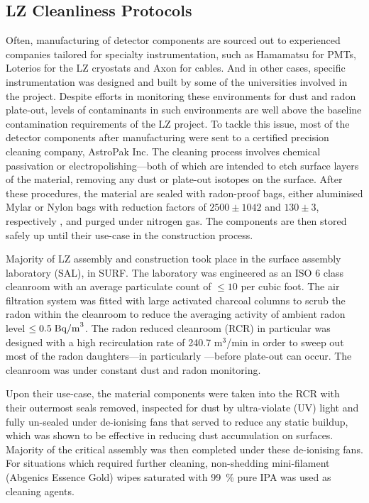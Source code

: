 \subsection{LZ Cleanliness Protocols}
\label{secsec:cleanliness}

Often, manufacturing of detector components are sourced out to  experienced companies tailored for specialty instrumentation, such as Hamamatsu for PMTs, Loterios for the LZ cryostats and Axon for cables. And in other cases, specific instrumentation was designed and built by some of the universities involved in the project. Despite efforts in monitoring these environments for dust and radon plate-out, levels of contaminants in such environments are well above the baseline contamination requirements of the LZ project. To tackle this issue, most of the detector components after manufacturing were sent to a certified precision cleaning company, AstroPak Inc. The cleaning process involves chemical passivation or electropolishing---both of which are intended to etch surface layers of the material, removing any dust or plate-out isotopes on the surface. After these procedures, the material are sealed with radon-proof bags, either aluminised Mylar or Nylon bags with reduction factors of ${2500 \pm 1042}$ and ${130 \pm 3}$, respectively \cite{Meng:2019ker}, and purged under nitrogen gas. The components are then stored safely up until their use-case in the construction process. 

Majority of LZ assembly and construction took place in the surface assembly laboratory (SAL), in SURF. The laboratory was engineered as an ISO 6 class cleanroom with an average particulate count of $\leq 10$ per cubic foot. The air filtration system was fitted with large activated charcoal columns to scrub the radon within the cleanroom to reduce the averaging activity of ambient radon level  $\leq 0.5 \; \text{Bq/m}^{3}$. The radon reduced cleanroom (RCR) in particular was designed with a high recirculation rate of 240.7 m$^3$/min in order to sweep out most of the radon daughters---in particularly \PoTOE---before plate-out can occur. The cleanroom was under constant dust and radon monitoring. 

Upon their use-case, the material components were taken into the RCR with their outermost seals removed, inspected for dust by ultra-violate (UV) light and fully un-sealed under de-ionising fans that served to reduce any static buildup, which was shown to be effective in reducing dust accumulation on surfaces. Majority of the critical assembly was then completed under these de-ionising fans. For situations which required further cleaning, non-shedding mini-filament (Abgenics Essence Gold) wipes saturated with \SI{99}{\percent} pure IPA was used as cleaning agents. 

